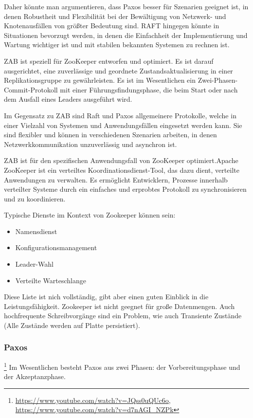 Daher könnte man argumentieren, dass Paxos besser für Szenarien geeignet ist, in denen Robustheit und Flexibilität bei der Bewältigung von Netzwerk- und Knotenausfällen von größter Bedeutung sind. RAFT hingegen könnte in Situationen bevorzugt werden, in denen die Einfachheit der Implementierung und Wartung wichtiger ist und mit stabilen bekannten Systemen zu rechnen ist.

ZAB ist speziell für ZooKeeper entworfen und optimiert. Es ist darauf ausgerichtet, eine zuverlässige und geordnete Zustandsaktualisierung in einer Replikationsgruppe zu gewährleisten. Es ist im Wesentlichen ein Zwei-Phasen-Commit-Protokoll mit einer Führungsfindungsphase, die beim Start oder nach dem Ausfall eines Leaders ausgeführt wird.

Im Gegensatz zu ZAB sind Raft und Paxos allgemeinere Protokolle, welche in einer Vielzahl von Systemen und Anwendungsfällen eingesetzt werden kann. Sie sind flexibler und können in verschiedenen Szenarien arbeiten, in denen Netzwerkkommunikation unzuverlässig und asynchron ist.

ZAB ist für den spezifischen Anwendungsfall von ZooKeeper optimiert.Apache ZooKeeper ist ein verteiltes Koordinationsdienst-Tool, das dazu dient, verteilte Anwendungen zu verwalten. Es ermöglicht Entwicklern, Prozesse innerhalb verteilter Systeme durch ein einfaches und erprobtes Protokoll zu synchronisieren und zu koordinieren.

Typische Dienste im Kontext von Zookeeper können sein:

\begin{itemize}
\item Namensdienst
\item Konfigurationsmanagement
\item Leader-Wahl
\item Verteilte Warteschlange
\end{itemize}

Diese Liste ist nich vollständig, gibt aber einen guten Einblick in die Leistungsfähigkeit. Zookeeper ist nicht geegnet für große Datenmengen. Auch hochfrequente Schreibvorgänge sind ein Problem, wie auch Transiente Zustände (Alle Zustände werden auf Platte persistiert).


\subsubsection{Paxos}\footnote{\url{https://www.youtube.com/watch?v=JQss0uQUc6o}, \url{https://www.youtube.com/watch?v=d7nAGI_NZPk}}
Im Wesentlichen besteht Paxos aus zwei Phasen: der Vorbereitungsphase und der Akzeptanzphase.

